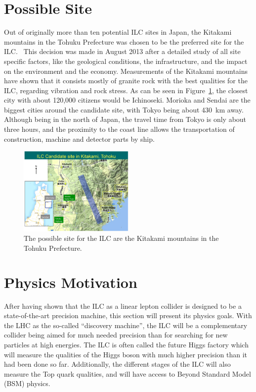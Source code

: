 \section{Possible Site}
\label{ILC:site}
Out of originally more than ten potential ILC sites in Japan, the Kitakami mountains in the Tohuku Prefecture was chosen to be the preferred site for the ILC.~\cite{Site}
This decision was made in August 2013 after a detailed study of all site specific factors, like the geological conditions, the infrastructure, and the impact on the environment and the economy.
Measurements of the Kitakami mountains have shown that it consists mostly of granite rock with the best qualities for the ILC, regarding vibration and rock stress.
As can be seen in Figure~\ref{fig:ILC_Site}, the closest city with about 120,000 citizens would be Ichinoseki.
Morioka and Sendai are the biggest cities around the candidate site, with Tokyo being about \SI{430}{\kilo\meter} away.
Although being in the north of Japan, the travel time from Tokyo is only about three hours, and the proximity to the coast line allows the transportation of construction, machine and detector parts by ship.
\begin{figure}
\centering
\includegraphics[width=0.5\textwidth]{Figures/ILC-site.jpg}
\caption[Possible site for the ILC]{The possible site for the ILC are the Kitakami mountains in the Tohuku Prefecture.\cite{Kitakami}}
\label{fig:ILC_Site}
\end{figure}


\section{Physics Motivation}
\label{ILC:physicsmotivation}
After having shown that the ILC as a linear lepton collider is designed to be a state-of-the-art precision machine, this section will present its physics goals.
With the LHC as the so-called ``discovery machine'', the ILC will be a complementary collider being aimed for much needed precision than for searching for new particles at high energies.
The ILC is often called the future Higgs factory which will measure the qualities of the Higgs boson with much higher precision than it had been done so far.
Additionally, the different stages of the ILC will also measure the Top quark qualities, and will have access to Beyond Standard Model (BSM) physics.
 
